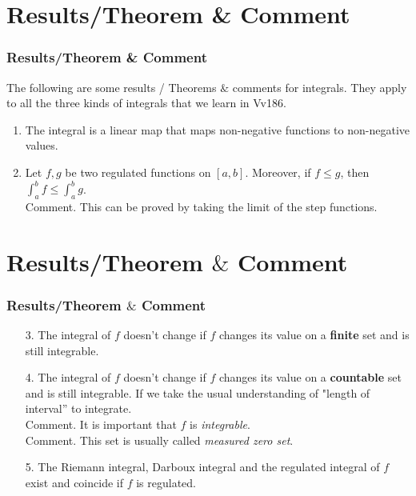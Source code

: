 \documentclass[12pt, t]{beamer}
\renewcommand{\emph}[1]{{\color{Turquoise3}\textsl{#1}}}
\begin{document}
\section{Results/Theorem \& Comment}
\begin{frame}
    \frametitle{Results/Theorem \& Comment}
    \hspace{2em}
    The following are some results / Theorems $\&$ comments for integrals. They apply to all the three kinds of integrals that we learn in Vv186.

    \begin{enumerate}
        \item The integral is a linear map that maps non-negative functions to non-negative values.\\
              \vspace{1em}
        \item Let $f,g$ be two regulated functions on $[a,b]$. Moreover, if $f\leq g$, then $\int_a^bf\leq\int_a^bg$.\\
              \footnotesize Comment. This can be proved by taking the limit of the step functions.
    \end{enumerate}

\end{frame}

\section{Results/Theorem $\&$ Comment}
\begin{frame}
    \frametitle{Results/Theorem $\&$ Comment}
    \begin{enumerate}
        \item[3.] The integral of $f$ doesn't change if $f$ changes its value on a \textbf{finite} set and is still integrable.\\
            \vspace{1em}
        \item[4.] The integral of $f$ doesn't change if $f$ changes its value on a \textbf{countable} set and is still integrable. If we take the usual understanding of "length of interval'' to integrate.\\
            \footnotesize Comment. It is important that $f$ is \emph{integrable}.\\
            \footnotesize Comment. This set is usually called \emph{measured zero set}.\\
            \vspace{1em}
        \item[5.] The Riemann integral, Darboux integral and the regulated integral of $f$ exist and coincide if $f$ is regulated.
    \end{enumerate}
\end{frame}
\end{document}
